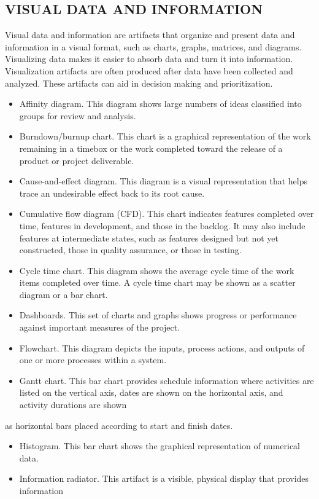 \documentclass[11pt]{article}
\begin{document}
\subsection{VISUAL DATA AND INFORMATION}
\label{sec:org259c160}
Visual data and information are artifacts that organize and present data and information in a visual format, such as charts, graphs, matrices, and diagrams. Visualizing data makes it easier to absorb data and turn it into information. Visualization artifacts are often produced after data have been collected and analyzed. These artifacts can aid in decision making and prioritization.
\begin{itemize}
\item Affinity diagram. This diagram shows large numbers of ideas classified into groups for review and analysis.
\item Burndown/burnup chart. This chart is a graphical representation of the work remaining in a timebox or the work completed toward the release of a product or project deliverable.
\item Cause-and-effect diagram. This diagram is a visual representation that helps trace an undesirable effect back to its root cause.
\item Cumulative flow diagram (CFD). This chart indicates features completed over time, features in development, and those in the backlog. It may also include features at intermediate states, such as features designed but not yet constructed, those in quality assurance, or those in testing.
\item Cycle time chart. This diagram shows the average cycle time of the work items completed over time. A cycle time chart may be shown as a scatter diagram or a bar chart.
\item Dashboards. This set of charts and graphs shows progress or performance against important measures of the project.
\item Flowchart. This diagram depicts the inputs, process actions, and outputs of one or more processes within a system.
\item Gantt chart. This bar chart provides schedule information where activities are listed on the vertical axis, dates are shown on the horizontal axis, and activity durations are shown
\end{itemize}
as horizontal bars placed according to start and finish dates.
\begin{itemize}
\item Histogram. This bar chart shows the graphical representation of numerical data.
\item Information radiator. This artifact is a visible, physical display that provides information
\end{itemize}
\end{document}
